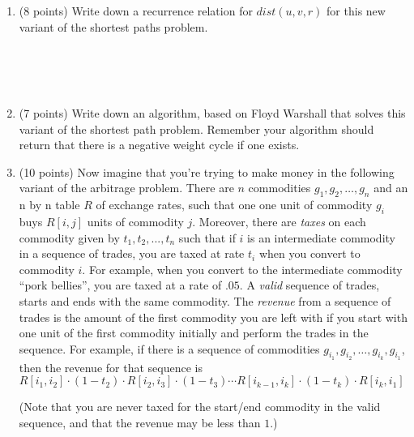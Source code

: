 \documentclass[11pt]{article}
\newcommand{\ans}[1]{ }
\begin{document}
\begin{enumerate}
\begin{enumerate}
\item (8 points) Write down a recurrence relation for $dist(u,v,r)$ for this new variant of the shortest paths problem. 

\ans{$dist(u,v,r) = w(u \rightarrow v)$ if $r=0$\\ else $dist(u,v,r) = min (dist(u,v,r-1), dist(u,r,r-1) + dist(r,v,r-1) + w'(r)$)}  \ \\ \ \\ \ \\ 

\pagebreak

\item (7 points) Write down an algorithm, based on Floyd Warshall that solves this variant of the shortest path problem.  Remember your algorithm should return that there is a negative weight cycle if one exists.

\ans{Run the lecture notes Floyd Warshall with the above recurrence.  Then at the end, check $dist(u,u,n)$ for all nodes $u$, if any of these values are negative, output that there is a negative weight cycle.}


\pagebreak

\item (10 points) Now imagine that you're trying to make money in the following variant of the arbitrage problem.  There are $n$ commodities $g_{1}, g_{2}, \ldots, g_{n}$ and an n by n table $R$ of exchange rates, such that one one unit of commodity $g_{i}$ buys $R[i,j]$ units of commodity $j$.  Moreover, there are \emph{taxes} on each commodity given by $t_{1}, t_{2}, ..., t_{n}$ such that if $i$ is an intermediate commodity in a sequence of trades, you are taxed at rate $t_{i}$ when you convert to commodity $i$.  For example, when you convert to the intermediate commodity ``pork bellies'', you are taxed at a rate of $.05$.  A \emph{valid} sequence of trades, starts and ends with the same commodity.  The \emph{revenue} from a sequence of trades is the amount of the first commodity you are left with if you start with one unit of the first commodity initially and perform the trades in the sequence.  For example, if there is a sequence of commodities $g_{i_{1}}, g_{i_{2}}, \ldots, g_{i_{k}}, g_{i_{1}}$, then the revenue for that sequence is\\ $R[i_{1},i_{2}]\cdot (1 - t_{2}) \cdot R[i_{2}, i_{3}] \cdot(1 -  t_{3}) \cdots R[i_{k-1},i_{k}] \cdot (1- t_{k}) \cdot R[i_{k},i_{1}]$

(Note that you are never taxed for the start/end commodity in the valid sequence, and that the revenue may be less than $1$.)


\end{enumerate}
\end{enumerate}
\end{document}
